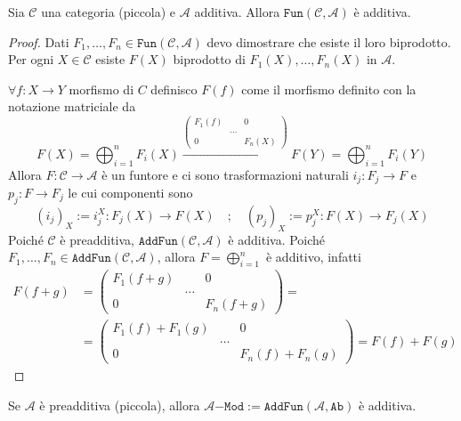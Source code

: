 \begin{remark}{}
    Sia \(\mathcal{C}\) una categoria (piccola) e \(\mathcal{A}\) additiva.
    Allora \(\mathtt{Fun}{(\mathcal{C}, \mathcal{A})}\) è additiva.
\end{remark}
\begin{proof}{}
    Dati \(F_{1}, \dots, F_{n} \in \mathtt{Fun}{(\mathcal{C}, \mathcal{A})}\)
    devo dimostrare che esiste il loro biprodotto.
    Per ogni \(X \in \mathcal{C}\) esiste \(F{(X)}\) biprodotto di
    \(F_{1}{(X)}, \dots, F_{n}{(X)}\) in \(\mathcal{A}\).

    \(\forall f : X \to Y\) morfismo di \(C\) definisco \(F{(f)}\) come il
    morfismo definito con la notazione matriciale da
    \[
      F{(X)} = \bigoplus_{i = 1}^{n}F_{i}{(X)} \overset{
        \begin{pmatrix}
            F_{1}{(f)} &  & 0 \\
             & \dots & \\
             0 &  & F_n{(X)}
        \end{pmatrix}
      }{\longrightarrow} F{(Y)} = \bigoplus_{i=1} ^{n} F_{i}{(Y)}
    \]
    Allora \(F: \mathcal{C} \to \mathcal{A}\) è un funtore e ci sono
    trasformazioni naturali \(i_j : F_{j} \to F\) e \(p_{j} : F \to F_{j}\) le
    cui componenti sono
    \[
      {(i_{j})}_X := i^{X}_j : F_{j}{(X)} \to F{(X)} \quad ; \quad {(p_j)}_X :=
      p_{j}^{X} : F{(X)} \to F_{j}{(X)}
    \]
    Poiché \(\mathcal{C}\) è preadditiva, \(\mathtt{AddFun}{(\mathcal{C},\mathcal{A})}\) è additiva.
    Poiché \(F_{1}, \dots, F_{n} \in \mathtt{AddFun}{(\mathcal{C}, \mathcal{A})}\), allora \(F = \bigoplus_{i=1} ^{n}\) è additivo, infatti
    \begin{align*}
        F{(f + g)} &= \begin{pmatrix}
          F_{1}{(f+g)} &  & 0 \\
           & \dots &  \\
           0 &  & F_n{(f + g)}
           \end{pmatrix} = \\ &=\begin{pmatrix}
          F_{1}{(f)}+F_{1}{(g)} &  & 0 \\
           & \dots &  \\
      0 &  & F_n{(f)} + F_n{(g)}
      \end{pmatrix} = F{(f)} + F{(g)}
    \end{align*}
\end{proof}

\begin{example}{}
    Se \(\mathcal{A}\) è preadditiva (piccola), allora \(\mathcal{A}\mathtt{-Mod} := \mathtt{AddFun}{(\mathcal{A}, \mathtt{Ab})}\) è additiva.
\end{example}

